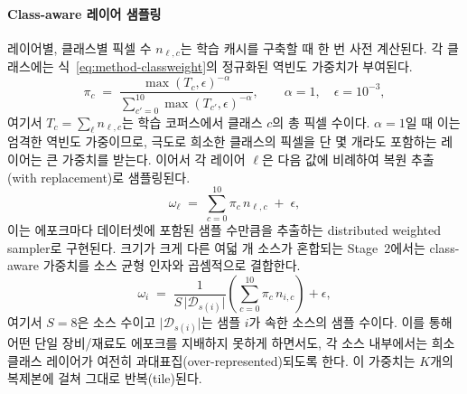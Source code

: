 \paragraph{Class-aware 레이어 샘플링}
레이어별, 클래스별 픽셀 수 $n_{\ell,c}$는 학습 캐시를 구축할 때 한 번
사전 계산된다. 각 클래스에는 식~\eqref{eq:method-classweight}의
정규화된 역빈도 가중치가 부여된다.
\begin{equation}
\pi_c \;=\;
\frac{\max(T_c, \epsilon)^{-\alpha}}
     {\sum_{c'=0}^{10} \max(T_{c'}, \epsilon)^{-\alpha}},
\qquad \alpha = 1, \quad \epsilon = 10^{-3},
\label{eq:method-classweight}
\end{equation}
여기서 $T_c = \sum_{\ell} n_{\ell,c}$는 학습 코퍼스에서 클래스 $c$의
총 픽셀 수이다. $\alpha = 1$일 때 이는 엄격한 역빈도 가중이므로,
극도로 희소한 클래스의 픽셀을 단 몇 개라도 포함하는 레이어는 큰
가중치를 받는다. 이어서 각 레이어 $\ell$은 다음 값에 비례하여 복원
추출(with replacement)로 샘플링된다.
\begin{equation}
\omega_{\ell} \;=\; \sum_{c=0}^{10} \pi_c\, n_{\ell,c} \;+\; \epsilon ,
\label{eq:method-layerweight}
\end{equation}
이는 에포크마다 데이터셋에 포함된 샘플 수만큼을 추출하는 distributed
weighted sampler로 구현된다. 크기가 크게 다른 여덟 개 소스가 혼합되는
Stage~2에서는 class-aware 가중치를 소스 균형 인자와 곱셈적으로
결합한다.
\begin{equation}
\omega_i \;=\;
\frac{1}{S \,\lvert \mathcal{D}_{s(i)} \rvert}
\left( \sum_{c=0}^{10} \pi_c\, n_{i,c} \right) + \epsilon ,
\label{eq:method-stage2weight}
\end{equation}
여기서 $S = 8$은 소스 수이고 $\lvert \mathcal{D}_{s(i)} \rvert$는 샘플
$i$가 속한 소스의 샘플 수이다. 이를 통해 어떤 단일 장비/재료도
에포크를 지배하지 못하게 하면서도, 각 소스 내부에서는 희소 클래스
레이어가 여전히 과대표집(over-represented)되도록 한다. 이 가중치는
$K$개의 복제본에 걸쳐 그대로 반복(tile)된다.


